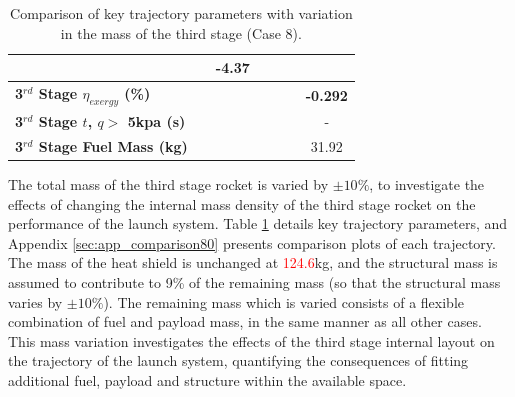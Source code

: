 \begin{table}[ht]
\begin{tabular}{l c c c c c c}
		& \SecondDistmThreeOneHundredTenNoReturn
		&-4.37
		\\
		\hline 
		\textbf{3$^{rd}$ Stage $\eta_{exergy}$ (\%)}
		& \textbf{\thirddExergyEffmThreeNinetyNoReturn}
		& \textbf{\thirddExergyEffmThreeNinetyFiveNoReturn}
		& \textbf{\thirddExergyEffmThreeStandardNoReturn}
		& \textbf{\thirddExergyEffmThreeOneHundredFiveNoReturn}
		& \textbf{\thirddExergyEffmThreeOneHundredTenNoReturn}
		& \textbf{-0.292}
		\\
		\textbf{3$^{rd}$ Stage $t$, $q >$ 5kpa (s)}
		& \thirdqOverFivemThreeNinetyNoReturn
		& \thirdqOverFivemThreeNinetyFiveNoReturn
		& \thirdqOverFivemThreeStandardNoReturn
		& \thirdqOverFivemThreeOneHundredFiveNoReturn
		& \thirdqOverFivemThreeOneHundredTenNoReturn
		& -
		\\
		\textbf{3$^{rd}$ Stage Fuel Mass (kg)}
		& \thirdmFuelmThreeNinetyNoReturn
		& \thirdmFuelmThreeNinetyFiveNoReturn
		& \thirdmFuelmThreeStandardNoReturn
		& \thirdmFuelmThreeOneHundredFiveNoReturn
		& \thirdmFuelmThreeOneHundredTenNoReturn
		&31.92
		\\
		\hline 
	\end{tabular} 
	\caption{Comparison of key trajectory parameters with variation in the mass of the third stage (Case 8).}
	\label{tab:comparison80}
\end{table}


The total mass of the third stage rocket is varied by $\pm10\%$, to investigate the effects of changing the internal mass density of the third stage rocket on the performance of the launch system. Table \ref{tab:comparison80} details key trajectory parameters, and Appendix \ref{sec:app_comparison80} presents comparison plots of each trajectory.
The mass of the heat shield is unchanged at \textcolor{red}{124.6}kg, and the structural mass is assumed to contribute to 9\% of the remaining mass (so that the structural mass varies by $\pm10\%$). The remaining mass which is varied consists of a flexible combination of fuel and payload mass, in the same manner as all other cases. 
This mass variation investigates the effects of the third stage internal layout on the trajectory of the launch system, quantifying the consequences of fitting additional fuel, payload and structure within the available space.

